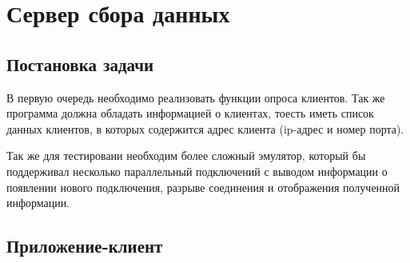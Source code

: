 \section{Сервер сбора данных}
\subsection{Постановка задачи}

В первую очередь необходимо реализовать функции опроса клиентов. Так же программа должна обладать информацией о клиентах, тоесть иметь список данных клиентов, в которых содержится адрес клиента (ip-адрес и номер порта).

Так же для тестировани необходим более сложный эмулятор, который бы поддерживал несколько параллельный подключений с выводом информации о появлении нового подключения, разрыве соединения и отображения полученной информации.

\subsection{Приложение-клиент}

